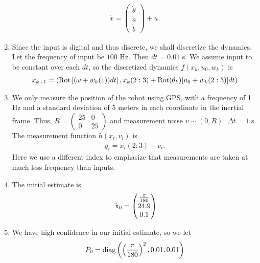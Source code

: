 \documentclass[12pt]{article}
\begin{document}
\begin{enumerate}[label=(\arabic*)]
\begin{align*}
			\dot{x} = \begin{pmatrix} \dot{\theta}\\ \dot{a}\\\dot{b}\end{pmatrix} + u.
		\end{align*}
	\item Since the input is digital and thus discrete, we shall discretize the dynamics. Let the frequency of input be $ 100$ Hz. Then  $ dt = 0.01$ s. We assume input to be constant over each $ dt$, so the discretized dynamics $ f(x_k, u_0, w_k)$ is
		\begin{align}
			x_{k+1} = \left( \operatorname{Rot} \left[ (\omega + w_k(1))dt \right], x_k(2:3) + \operatorname{Rot}(\theta_k) [u_0 + w_k(2:3)] dt   \right) 
		\end{align}
	\item We only measure the position of the robot using GPS, with a frequency of 1 Hz and a standard deviation of 5 meters in each coordinate in the inertial frame. Thus, $ R = \begin{pmatrix} 25&0\\0&25 \end{pmatrix} $ and measurement noise $ v \sim (0,R) $. $ \Delta t = 1$ s. The measurement function $ h(x_i,v_i)$ is
		\begin{align*}
			y_i = x_i(2:3) + v_i .
		\end{align*}
		Here we use a different index to emphasize that measurements are taken at much less frequency than inputs.
	\item The initial estimate is
		\begin{align*}
			\wh{ x}_0 = \begin{pmatrix} \frac{\pi}{180}\\ 24.9\\0.1 \end{pmatrix} 
		\end{align*}
	\item We have high confidence in our initial estimate, so we let
		\begin{align*}
			P_0 = \operatorname{diag}\left( \left( \frac{\pi}{180} \right)^2, 0.01, 0.01\right) 
		\end{align*}
\end{enumerate}
\end{document}
